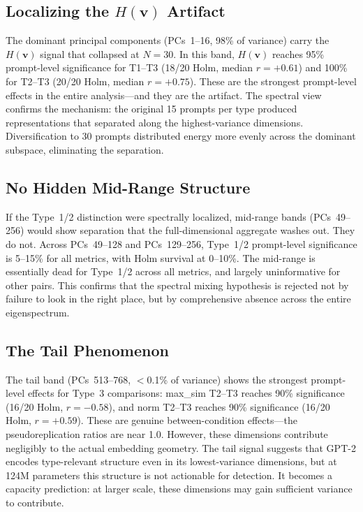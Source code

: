 \documentclass[11pt]{article}
\newcommand{\Hv}{H(\mathbf{v})}
\begin{document}
\subsection{Localizing the $\Hv$ Artifact}

The dominant principal components (PCs~1--16, 98\% of variance) carry the $\Hv$ signal that collapsed at $N = 30$. In this band, $\Hv$ reaches 95\% prompt-level significance for T1--T3 (18/20 Holm, median $r = +0.61$) and 100\% for T2--T3 (20/20 Holm, median $r = +0.75$). These are the strongest prompt-level effects in the entire analysis---and they are the artifact. The spectral view confirms the mechanism: the original 15 prompts per type produced representations that separated along the highest-variance dimensions. Diversification to 30 prompts distributed energy more evenly across the dominant subspace, eliminating the separation.

\subsection{No Hidden Mid-Range Structure}

If the Type~1/2 distinction were spectrally localized, mid-range bands (PCs~49--256) would show separation that the full-dimensional aggregate washes out. They do not. Across PCs~49--128 and PCs~129--256, Type~1/2 prompt-level significance is 5--15\% for all metrics, with Holm survival at 0--10\%. The mid-range is essentially dead for Type~1/2 across all metrics, and largely uninformative for other pairs. This confirms that the spectral mixing hypothesis is rejected not by failure to look in the right place, but by comprehensive absence across the entire eigenspectrum.

\subsection{The Tail Phenomenon}

The tail band (PCs~513--768, $<$0.1\% of variance) shows the strongest prompt-level effects for Type~3 comparisons: max\_sim T2--T3 reaches 90\% significance (16/20 Holm, $r = -0.58$), and norm T2--T3 reaches 90\% significance (16/20 Holm, $r = +0.59$). These are genuine between-condition effects---the pseudoreplication ratios are near 1.0. However, these dimensions contribute negligibly to the actual embedding geometry. The tail signal suggests that GPT-2 encodes type-relevant structure even in its lowest-variance dimensions, but at 124M parameters this structure is not actionable for detection. It becomes a capacity prediction: at larger scale, these dimensions may gain sufficient variance to contribute.
\end{document}
